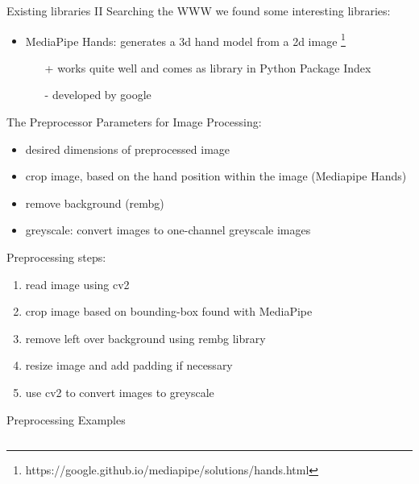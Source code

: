\documentclass[aspectratio=169]{beamer}
\begin{document}
{	\begin{frame}{Existing libraries II}
	Searching the WWW we found some interesting libraries:
	\begin{itemize}
		\item MediaPipe Hands: generates a 3d hand model from a 2d image \footnote{https://google.github.io/mediapipe/solutions/hands.html} \cite{mediapipe}
		\begin{itemize}
			\item[+] works quite well and comes as library in Python Package Index 
			\item[-] developed by google
		\end{itemize}
	\end{itemize}
	\end{frame}
	
	\begin{frame}{The Preprocessor}
	Parameters for Image Processing:
	\begin{itemize}
		\item desired dimensions  of preprocessed image
		\item crop image, based on the hand position within the image (Mediapipe Hands)
		\item remove background (rembg)
		\item greyscale: convert images to one-channel greyscale images
	\end{itemize}
	\pause
	Preprocessing steps:
	\begin{enumerate}
	\item read image using cv2
	\item crop image based on bounding-box found with MediaPipe
	\item remove left over background using rembg library
	\item resize image and add padding if necessary
	\item use cv2 to convert images to greyscale
	\end{enumerate}
	\end{frame}
	
	
	\begin{frame}{Preprocessing Examples}

\begin{columns}[c]


\end{columns}
\end{frame}}
\end{document}
